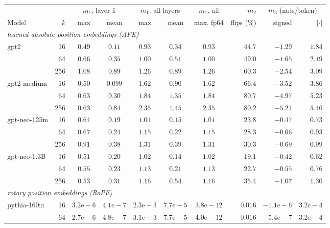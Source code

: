\begin{tabular}{lr ccccc r rr}
\toprule
 & & \multicolumn{2}{c}{$m_1$, layer 1} & \multicolumn{2}{c}{$m_1$, all layers} & $m_1$, all & $m_2$ & \multicolumn{2}{c}{$m_3$ (nats/token)} \\
\cmidrule(lr){3-4}\cmidrule(lr){5-6}\cmidrule(lr){7-7}\cmidrule(lr){8-8}\cmidrule(lr){9-10}
Model & $k$ & max & mean & max & mean & max, fp64 & flips (\%) & signed & $|\cdot|$ \\
\midrule
\multicolumn{10}{l}{\emph{learned absolute position embeddings (APE)}} \\
gpt2 & 16 & $0.49$ & $0.11$ & $0.93$ & $0.34$ & $0.93$ & $44.7$ & $-1.29$ & $1.84$ \\
 & 64 & $0.66$ & $0.35$ & $1.00$ & $0.51$ & $1.00$ & $49.0$ & $-1.65$ & $2.19$ \\
 & 256 & $1.08$ & $0.89$ & $1.26$ & $0.89$ & $1.26$ & $60.3$ & $-2.54$ & $3.09$ \\
gpt2-medium & 16 & $0.50$ & $0.099$ & $1.62$ & $0.90$ & $1.62$ & $66.4$ & $-3.52$ & $3.86$ \\
 & 64 & $0.63$ & $0.30$ & $1.84$ & $1.35$ & $1.84$ & $80.7$ & $-4.97$ & $5.23$ \\
 & 256 & $0.63$ & $0.84$ & $2.35$ & $1.45$ & $2.35$ & $80.2$ & $-5.21$ & $5.46$ \\
gpt-neo-125m & 16 & $0.64$ & $0.19$ & $1.01$ & $0.15$ & $1.01$ & $23.8$ & $-0.47$ & $0.73$ \\
 & 64 & $0.67$ & $0.24$ & $1.15$ & $0.22$ & $1.15$ & $28.3$ & $-0.66$ & $0.93$ \\
 & 256 & $0.91$ & $0.38$ & $1.31$ & $0.39$ & $1.31$ & $30.3$ & $-0.69$ & $0.99$ \\
gpt-neo-1.3B & 16 & $0.51$ & $0.20$ & $1.02$ & $0.14$ & $1.02$ & $19.1$ & $-0.42$ & $0.62$ \\
 & 64 & $0.55$ & $0.23$ & $1.13$ & $0.21$ & $1.13$ & $22.7$ & $-0.55$ & $0.76$ \\
 & 256 & $0.53$ & $0.31$ & $1.16$ & $0.54$ & $1.16$ & $35.4$ & $-1.07$ & $1.30$ \\
\midrule
\multicolumn{10}{l}{\emph{rotary position embeddings (RoPE)}} \\
pythia-160m & 16 & $3.2\text{e}-6$ & $4.1\text{e}-7$ & $2.3\text{e}-3$ & $7.7\text{e}-5$ & $3.8\text{e}-12$ & $0.016$ & $-1.1\text{e}-6$ & $3.2\text{e}-4$ \\
 & 64 & $2.7\text{e}-6$ & $4.8\text{e}-7$ & $3.1\text{e}-3$ & $7.7\text{e}-5$ & $4.0\text{e}-12$ & $0.016$ & $-5.4\text{e}-7$ & $3.2\text{e}-4$ \\

\end{tabular}
